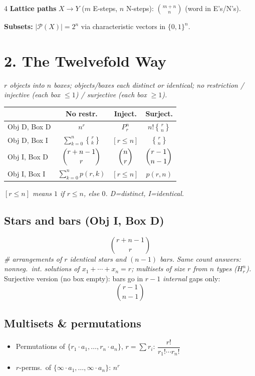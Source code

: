 \documentclass[8pt]{extarticle}
\newcommand{\stir}[2]{\genfrac{\{}{\}}{0pt}{}{#1}{#2}}   %
\newcommand{\note}[1]{{\footnotesize\color{gray!70!black}\emph{#1}}}
\begin{document}
\begin{multicols}{4}
\textbf{Lattice paths} $X\to Y$ ($m$ E-steps, $n$ N-steps): $\binom{m+n}{n}$ (word in E's/N's).

\textbf{Subsets:} $|\mathcal P(X)|=2^n$ via characteristic vectors in $\{0,1\}^n$.

\section{2. The Twelvefold Way}
\note{$r$ objects into $n$ boxes; objects/boxes each distinct or identical; no restriction / injective (each box $\le 1$) / surjective (each box $\ge1$).}

\begin{tab}
\centering
\renewcommand{\arraystretch}{1.9}
\begin{tabular}{@{}l c c c@{}}
\toprule
 & No restr. & Inject. & Surject. \\
\midrule
Obj D, Box D & $n^r$ & $P^n_r$ & $n!\stir{r}{n}$ \\
Obj D, Box I & $\sum\limits_{k=0}^n\stir{r}{k}$ & $[r\le n]$ & $\stir{r}{n}$ \\
Obj I, Box D & $\dbinom{r+n-1}{r}$ & $\dbinom{n}{r}$ & $\dbinom{r-1}{n-1}$ \\
Obj I, Box I & $\sum\limits_{k=0}^n p(r,k)$ & $[r\le n]$ & $p(r,n)$ \\
\bottomrule
\end{tabular}
\end{tab}
\note{$[r\le n]$ means $1$ if $r\le n$, else $0$. D=distinct, I=identical.}

\subsection*{Stars and bars (Obj I, Box D)}
\[ \binom{r+n-1}{r} \]
\note{\# arrangements of $r$ identical stars and $(n-1)$ bars.}
\note{Same count answers: nonneg.\ int. solutions of $x_1+\cdots+x_n=r$; multisets of size $r$ from $n$ types ($H^n_r$).}
Surjective version (no box empty): bars go in $r-1$ \emph{internal} gaps only:
\[ \binom{r-1}{n-1} \]

\subsection*{Multisets \& permutations}
\begin{itemize}
\item Permutations of $\{r_1\cdot a_1,\dots,r_n\cdot a_n\}$, $r=\sum r_i$: $\dfrac{r!}{r_1!\cdots r_n!}$
\item $r$-perms.\ of $\{\infty\cdot a_1,\dots,\infty\cdot a_n\}$: $n^r$
\end{itemize}


\end{multicols}
\end{document}
